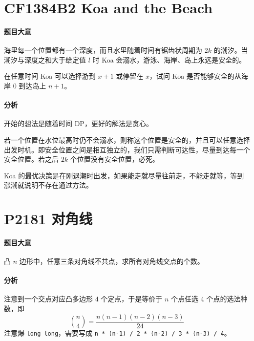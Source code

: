 \section{CF1384B2 Koa and the Beach}

\paragraph{题目大意}

海里每一个位置都有一个深度，而且水里随着时间有锯齿状周期为 $2k$ 的潮汐。当潮汐与深度之和大于给定值 $l$ 时 Koa 会溺水，游泳、海岸、岛上永远是安全的。

在任意时间 Koa 可以选择游到 $x+1$ 或停留在 $x$，试问 Koa 是否能够安全的从海岸 $0$ 到达岛上 $n+1$。

\paragraph{分析}

开始的想法是随着时间 DP，更好的解法是贪心。

若一个位置在水位最高时仍不会溺水，则称这个位置是安全的，并且可以任意选择出发时机。即安全位置之间是相互独立的，我们只需判断可达性，尽量到达每一个安全位置。若之后 $2k$ 个位置没有安全位置，必死。

Koa 的最优决策是在刚退潮时出发，如果能走就尽量往前走，不能走就等，等到涨潮就说明不存在通过方法。

\section{P2181 对角线}

\paragraph{题目大意}

凸 $n$ 边形中，任意三条对角线不共点，求所有对角线交点的个数。

\paragraph{分析}

注意到一个交点对应凸多边形 $4$ 个定点，于是等价于 $n$ 个点任选 $4$ 个点的选法种数，即
\[
\binom{n}{4} = \frac{n(n-1)(n-2)(n-3)}{24}
\]
注意爆 \verb`long long`，需要写成 \verb`n * (n-1) / 2 * (n-2) / 3 * (n-3) / 4`。
